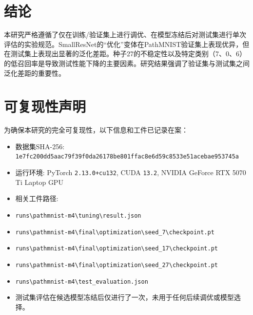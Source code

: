 \documentclass[10pt]{article}
\begin{document}
\section{结论}
本研究严格遵循了仅在训练/验证集上进行调优、在模型冻结后对测试集进行单次评估的实验规范。SmallResNet的“优化”变体在PathMNIST验证集上表现优异，但在测试集上表现出显著的泛化差距。种子27的不稳定性以及特定类别（7、0、6）的低召回率是导致测试性能下降的主要因素。研究结果强调了验证集与测试集之间泛化差距的重要性。
\section{可复现性声明}
为确保本研究的完全可复现性，以下信息和工件已记录在案：
\begin{itemize}
\item 数据集SHA-256: \texttt{1e7fc200dd5aac79f39f0da26178be801ffac8e6d59c8533e51acebae953745a}
\item 运行环境: PyTorch \texttt{2.13.0+cu132}, CUDA \texttt{13.2}, NVIDIA GeForce RTX 5070 Ti Laptop GPU
\item 相关工件路径:
\item \texttt{runs\textbackslash{}pathmnist-m4\textbackslash{}tuning\textbackslash{}result.json}
\item \texttt{runs\textbackslash{}pathmnist-m4\textbackslash{}final\textbackslash{}optimization\textbackslash{}seed\_7\textbackslash{}checkpoint.pt}
\item \texttt{runs\textbackslash{}pathmnist-m4\textbackslash{}final\textbackslash{}optimization\textbackslash{}seed\_17\textbackslash{}checkpoint.pt}
\item \texttt{runs\textbackslash{}pathmnist-m4\textbackslash{}final\textbackslash{}optimization\textbackslash{}seed\_27\textbackslash{}checkpoint.pt}
\item \texttt{runs\textbackslash{}pathmnist-m4\textbackslash{}test\_evaluation.json}
\item 测试集评估在候选模型冻结后仅进行了一次，未用于任何后续调优或模型选择。
\end{itemize}
\end{document}
